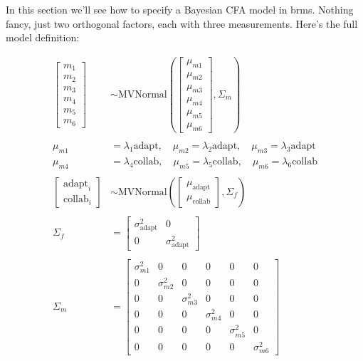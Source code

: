 \documentclass[
  letterpaper,
  DIV=11,
  numbers=noendperiod]{scrreprt}
\begin{document}
In this section we'll see how to specify a Bayesian CFA model in brms.
Nothing fancy, just two orthogonal factors, each with three
measurements. Here's the full model definition:

\[
\begin{aligned}
\begin{bmatrix}
m_{1} \\
m_{2} \\
m_{3} \\
m_{4} \\
m_{5} \\
m_{6}
\end{bmatrix}
&\sim \text{MVNormal}
\left(
\begin{bmatrix}
\mu_{m1} \\
\mu_{m2} \\
\mu_{m3} \\
\mu_{m4} \\
\mu_{m5} \\
\mu_{m6}
\end{bmatrix},
\Sigma_m
\right) \\
\\
\mu_{m1} &= \lambda_1 \text{adapt}, \quad \mu_{m2} = \lambda_2 \text{adapt}, \quad \mu_{m3} = \lambda_3 \text{adapt} \\
\mu_{m4} &= \lambda_4 \text{collab}, \quad \mu_{m5} = \lambda_5 \text{collab}, \quad \mu_{m6} = \lambda_6 \text{collab} \\
\\
\begin{bmatrix}
\text{adapt}_{i} \\
\text{collab}_{i}
\end{bmatrix}
&\sim \text{MVNormal}
\left(
\begin{bmatrix}
\mu_\text{adapt} \\
\mu_\text{collab}
\end{bmatrix},
\Sigma_f
\right) \\
\\
\Sigma_f &=
\begin{bmatrix}
\sigma_\text{adapt}^2 & 0 \\
0 & \sigma_\text{adapt}^2
\end{bmatrix} \\
\\
\Sigma_m &=
\begin{bmatrix}
\sigma_{m1}^2 & 0 & 0 & 0 & 0 & 0 \\
0 & \sigma_{m2}^2 & 0 & 0 & 0 & 0 \\
0 & 0 & \sigma_{m3}^2 & 0 & 0 & 0 \\
0 & 0 & 0 & \sigma_{m4}^2 & 0 & 0 \\
0 & 0 & 0 & 0 & \sigma_{m5}^2 & 0 \\
0 & 0 & 0 & 0 & 0 & \sigma_{m6}^2
\end{bmatrix}
\end{aligned}
\]
\end{document}
